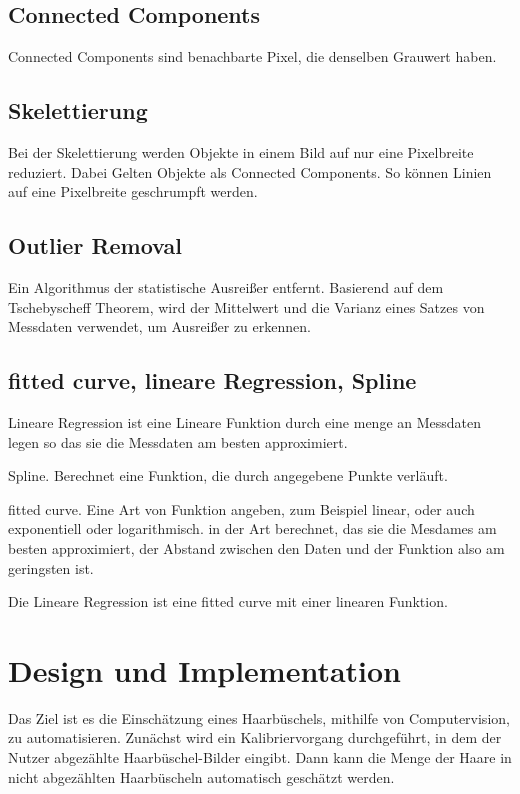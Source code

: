 \documentclass[german,a4paper, 12pt]{llncs}
\begin{document}
\subsection{Connected Components}

Connected Components sind benachbarte Pixel, die denselben Grauwert haben. \cite{ConnectedComponents}

\subsection{Skelettierung}
Bei der Skelettierung werden Objekte in einem Bild auf nur eine Pixelbreite reduziert. Dabei Gelten Objekte als Connected Components. So können Linien auf eine Pixelbreite geschrumpft werden.\cite{skel}

\subsection{Outlier Removal}

Ein Algorithmus der statistische Ausreißer entfernt. 
Basierend auf dem Tschebyscheff Theorem, wird der Mittelwert und die Varianz eines Satzes von Messdaten verwendet, um Ausreißer zu erkennen.\cite{outlierRemoval}

\subsection{fitted curve, lineare Regression, Spline}

Lineare Regression ist eine Lineare Funktion durch eine menge an Messdaten legen so das sie die Messdaten am besten approximiert.

Spline. Berechnet eine Funktion, die durch angegebene Punkte verläuft.\cite{splineScipy}

fitted curve. Eine Art von Funktion angeben, zum Beispiel linear, oder auch exponentiell oder logarithmisch. in der Art berechnet, das sie die Mesdames am besten approximiert, der Abstand zwischen den Daten und der Funktion also am geringsten ist. 

Die Lineare Regression ist eine fitted curve mit einer linearen Funktion.\cite{curveFittingIntro,curveFittingScipy}

\section{Design und Implementation}

Das Ziel ist es die Einschätzung eines Haarbüschels, mithilfe von Computervision, zu automatisieren. Zunächst wird ein Kalibriervorgang durchgeführt, in dem der Nutzer abgezählte Haarbüschel-Bilder eingibt. Dann kann die Menge der Haare in nicht abgezählten Haarbüscheln automatisch geschätzt werden.
\end{document}
